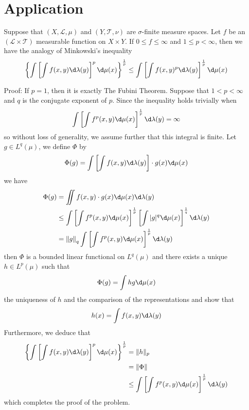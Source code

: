\documentclass[12pt, a4paper, oneside]{book}
\begin{document}
\section{Application}
\begin{theorem}[Minkowski]
    Suppose that $(X, \mathscr{L}, \mu)$ and $(Y, \mathscr{T}, \nu)$ are $\sigma$-finite measure spaces. Let $f$ be an $(\mathscr{L} \times \mathscr{T})$ measurable function on $X \times Y$. If $0 \leq f \leq \infty$ and $1 \leq p<\infty$, then we have the analogy of Minkowski's inequality
    \begin{equation*}\left\{\int \left[\int f(x,y) \d \lambda(y)\right]^p \d \mu(x)\right\}^{\frac{1}{p}}
        \leq
        \int \left[\int f(x,y)^p \d \lambda(y)\right]^{\frac{1}{p}} \d \mu(x)
    \end{equation*}

    Proof: If $p=1$, then it is exactly The Fubini Theorem. Suppose that $1<p<\infty$ and $q$ is the conjugate exponent of $p$. Since the inequality holds trivially when
    $$
        \int\left[\int f^p(x, y) \d \mu(x)\right]^{\frac{1}{p}} \d  \lambda(y)=\infty
    $$
    so without loss of generality, we assume further that this integral is finite. Let $g \in L^q(\mu)$, we define $\Phi$ by
    $$
        \Phi(g)=\int\left[\int f(x, y) \d \lambda(y)\right] \cdot g(x) \d \mu(x)
    $$
    we have
    $$
        \begin{aligned}
            \Phi (g) & =\iint f(x, y) \cdot g(x) \d \mu(x) \d \lambda(y)                                                                          \\
                     & \leq \int \left[\int f^p(x, y) \d \mu(x)\right]^{\frac{1}{p}}\left[\int|g|^q \d \mu(x)\right]^{\frac{1}{q}} \d  \lambda(y) \\
                     & =\left\| g \right\|_q \int\left[\int f^p(x, y) \d \mu(x)\right]^{\frac{1}{p}} \d \lambda(y)
        \end{aligned}
    $$
    then $\Phi$ is a bounded linear functional on $L^q(\mu)$ and there exists a unique $h \in L^p(\mu)$ such that
    $$
        \Phi(g)=\int h g \d \mu(x)
    $$
    the uniqueness of $h$ and the comparison of the representations and show that
    $$
        h(x)=\int f(x, y) \d \lambda(y)
    $$
    Furthermore, we deduce that
    $$
        \begin{aligned}
            \left\{\int\left[\int f(x, y) \d \lambda(y)\right]^p \d \mu(x)\right\}^{\frac{1}{p}} & =\|h\|_p                                                                   \\
                                                                                                 & =\|\Phi\|                                                                  \\
                                                                                                 & \leq \int\left[\int f^p(x, y) \d \mu(x)\right]^{\frac{1}{p}} \d \lambda(y)
        \end{aligned}
    $$
    which completes the proof of the problem.
\end{theorem}
\end{document}
